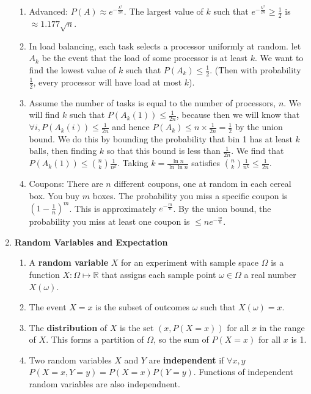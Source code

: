 \documentclass[10pt]{article}
\begin{document}
\begin{multicols}{2}
\begin{enumerate}
\begin{enumerate}
            \item Advanced: $P(A) \approx e^{- \frac{k^2}{2n}}$. The largest value of $k$ such that $e^{- \frac{k^2}{2n}} \geq \frac{1}{2}$ is $\approx 1.177 \sqrt{n}$.
            
            \item In load balancing, each task selects a processor uniformly at random. let $A_k$ be the event that the load of some processor is at least $k$. We want to find the lowest value of $k$ such that $P(A_k) \leq \frac{1}{2}$. (Then with probability $\frac{1}{2}$, every processor will have load at most $k$). 
            \item Assume the number of tasks is equal to the number of processors, $n$. We will find $k$ such that $P(A_k(1)) \leq \frac{1}{2n}$, because then we will know that $\forall i, P(A_k(i)) \leq \frac{1}{2n}$ and hence $P(A_k) \leq n \times \frac{1}{2n}=\frac{1}{2}$ by the union bound. We do this by bounding the probability that bin 1 has at least $k$ balls, then finding $k$ so that this bound is less than $\frac{1}{2n}$. We find that $P(A_k(1)) \leq {n \choose k} \frac{1}{n^k}$. Taking $k=\frac{\ln n}{\ln \ln n}$ satisfies ${n \choose k} \frac{1}{n^k} \leq \frac{1}{2n}$.
            
            \item Coupons: There are $n$ different coupons, one at random in each cereal box. You buy $m$ boxes. The probability you miss a specific coupon is $(1-\frac{1}{n})^m$. This is approximately $e^{-\frac{m}{n}}$. By the union bound, the probability you miss at least one coupon is $\leq ne^{-\frac{m}{n}}$.
        \end{enumerate}
        \item \textbf{Random Variables and Expectation}
        \begin{enumerate}
            \item A \textbf{random variable} $X$ for an experiment with sample space $\Omega$ is a function $X: \Omega \mapsto \mathbb{R}$ that assigns each sample point $\omega \in \Omega$ a real number $X(\omega)$. 
            \item The event $X = x$ is the subset of outcomes $\omega$ such that $X(\omega)=x$.
            \item The \textbf{distribution} of $X$ is the set $(x, P(X = x))$ for all $x$ in the range of $X$. This forms a partition of $\Omega$, so the sum of $P(X = x)$ for all $x$ is 1.
            \item Two random variables $X$ and $Y$ are \textbf{independent} if $\forall x, y$ $P(X = x,Y=y)=P(X=x)P(Y=y)$. Functions of independent random variables are also independnent. 
            

\end{enumerate}
\end{enumerate}
\end{multicols}
\end{document}
